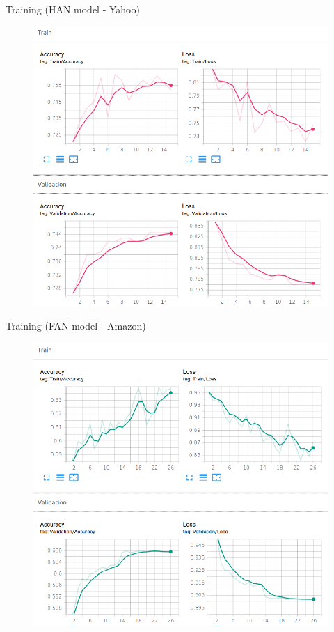 \documentclass[10pt]{beamer}
\begin{document}
\begin{frame}{Training (HAN model - Yahoo)}

\begin{figure}[H]
\centering
\includegraphics[scale=0.3]{img/yahoo-han.png}
\end{figure}

\end{frame}

\begin{frame}{Training (FAN model - Amazon)}

\begin{figure}[H]
\centering
\includegraphics[scale=0.3]{img/amazon-fan.png}
\end{figure}

\end{frame}
\end{document}
